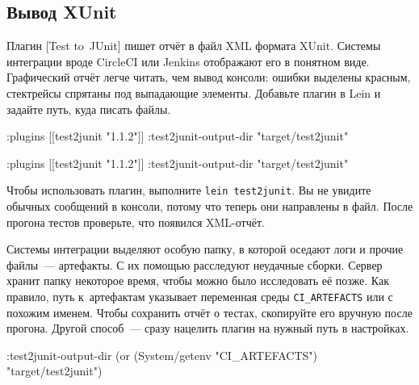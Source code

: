 \subsection{Вывод XUnit}


Плагин [Test to~JUnit] пишет отчёт
в файл XML формата XUnit. Системы интеграции вроде CircleCI или Jenkins
отображают его в понятном виде. Графический отчёт легче читать, чем вывод
консоли: ошибки выделены красным, стектрейсы спрятаны под выпадающие
элементы. Добавьте плагин в Lein и задайте путь, куда писать файлы.

\ifx\DEVICETYPE\MOBILE

\begin{english}
  \begin{clojure}
:plugins [[test2junit "1.1.2"]]
:test2junit-output-dir
  "target/test2junit"
  \end{clojure}
\end{english}

\else

\begin{english}
  \begin{clojure}
:plugins [[test2junit "1.1.2"]]
:test2junit-output-dir "target/test2junit"
  \end{clojure}
\end{english}

\fi

Чтобы использовать плагин, выполните \verb|lein test2junit|. Вы не увидите
обычных сообщений в консоли, потому что теперь они направлены в файл. После
прогона тестов проверьте, что появился XML-отчёт.

Системы интеграции выделяют особую папку, в которой оседают логи и прочие
файлы~--- артефакты. С их помощью расследуют неудачные сборки. Сервер хранит
папку некоторое время, чтобы можно было исследовать её позже. Как правило, путь
к~артефактам указывает переменная среды \verb|CI_ARTEFACTS| или с похожим
именем. Чтобы сохранить отчёт о тестах, скопируйте его вручную после
прогона. Другой способ~--- сразу нацелить плагин на нужный путь в настройках.

\ifx\DEVICETYPE\MOBILE

\begin{english}
  \begin{clojure}
:test2junit-output-dir
  (or (System/getenv "CI_ARTEFACTS")
      "target/test2junit")
  \end{clojure}
\end{english}

